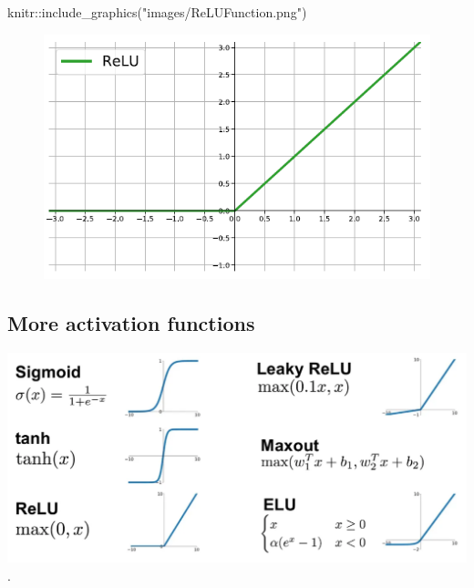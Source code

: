 \documentclass[
  letterpaper,
  DIV=11,
  numbers=noendperiod]{scrartcl}
\newenvironment{Shaded}{\begin{snugshade}}{\end{snugshade}}
\newcommand{\FunctionTok}[1]{\textcolor[rgb]{0.28,0.35,0.67}{#1}}
\newcommand{\NormalTok}[1]{\textcolor[rgb]{0.00,0.23,0.31}{#1}}
\newcommand{\SpecialCharTok}[1]{\textcolor[rgb]{0.37,0.37,0.37}{#1}}
\newcommand{\StringTok}[1]{\textcolor[rgb]{0.13,0.47,0.30}{#1}}
\begin{document}
\begin{Shaded}
\begin{Highlighting}[]
\NormalTok{knitr}\SpecialCharTok{::}\FunctionTok{include\_graphics}\NormalTok{(}\StringTok{"images/ReLUFunction.png"}\NormalTok{)}
\end{Highlighting}
\end{Shaded}

\begin{figure}[H]

{\centering \includegraphics[width=1\textwidth,height=\textheight]{images/ReLUFunction.png}

}

\end{figure}

\hypertarget{more-activation-functions}{%
\subsection{More activation functions}\label{more-activation-functions}}

\includegraphics[width=1\textwidth,height=\textheight]{images/ActivationFunctions.png}.
\end{document}
